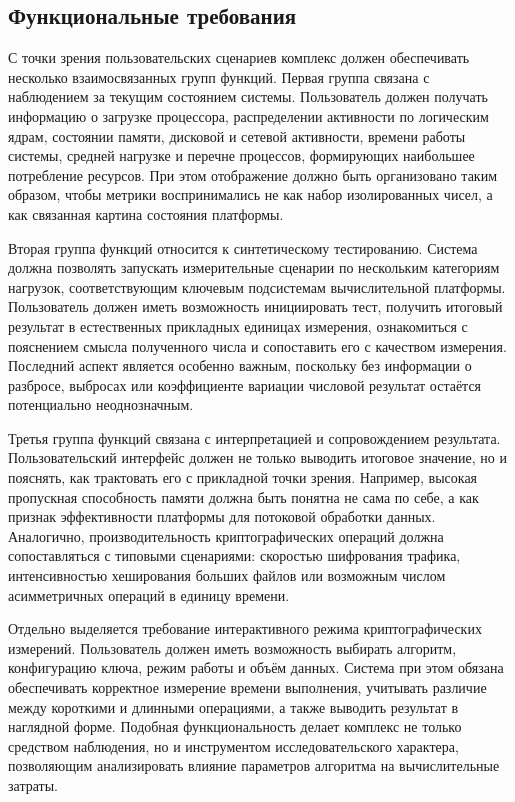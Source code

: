\subsection{Функциональные требования}

С точки зрения пользовательских сценариев комплекс должен обеспечивать несколько взаимосвязанных групп функций. Первая группа связана с наблюдением за текущим состоянием системы. Пользователь должен получать информацию о загрузке процессора, распределении активности по логическим ядрам, состоянии памяти, дисковой и сетевой активности, времени работы системы, средней нагрузке и перечне процессов, формирующих наибольшее потребление ресурсов. При этом отображение должно быть организовано таким образом, чтобы метрики воспринимались не как набор изолированных чисел, а как связанная картина состояния платформы.

Вторая группа функций относится к синтетическому тестированию. Система должна позволять запускать измерительные сценарии по нескольким категориям нагрузок, соответствующим ключевым подсистемам вычислительной платформы. Пользователь должен иметь возможность инициировать тест, получить итоговый результат в естественных прикладных единицах измерения, ознакомиться с пояснением смысла полученного числа и сопоставить его с качеством измерения. Последний аспект является особенно важным, поскольку без информации о разбросе, выбросах или коэффициенте вариации числовой результат остаётся потенциально неоднозначным.

Третья группа функций связана с интерпретацией и сопровождением результата. Пользовательский интерфейс должен не только выводить итоговое значение, но и пояснять, как трактовать его с прикладной точки зрения. Например, высокая пропускная способность памяти должна быть понятна не сама по себе, а как признак эффективности платформы для потоковой обработки данных. Аналогично, производительность криптографических операций должна сопоставляться с типовыми сценариями: скоростью шифрования трафика, интенсивностью хеширования больших файлов или возможным числом асимметричных операций в единицу времени.

Отдельно выделяется требование интерактивного режима криптографических измерений. Пользователь должен иметь возможность выбирать алгоритм, конфигурацию ключа, режим работы и объём данных. Система при этом обязана обеспечивать корректное измерение времени выполнения, учитывать различие между короткими и длинными операциями, а также выводить результат в наглядной форме. Подобная функциональность делает комплекс не только средством наблюдения, но и инструментом исследовательского характера, позволяющим анализировать влияние параметров алгоритма на вычислительные затраты.

